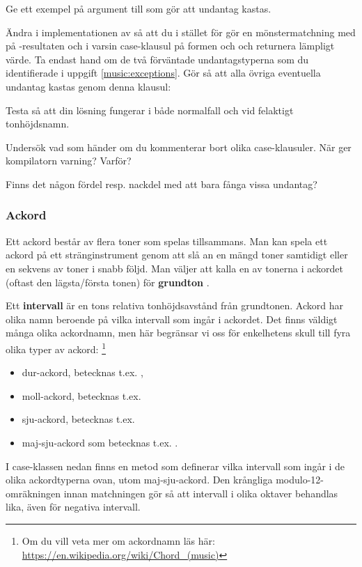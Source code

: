 {\Subtask\Pen Ge ett exempel på argument till  som gör att undantag kastas.


\Task Ändra i implementationen av  så att du i stället för  gör en mönstermatchning med  på -resultaten  och  i varsin case-klausul på formen  och  och returnera lämpligt värde. Ta endast hand om de två förväntade undantagstyperna som du identifierade i uppgift \ref{music:exceptions}. Gör så att alla övriga eventuella undantag kastas genom denna klausul: 

\Subtask Testa så att din lösning fungerar i både normalfall och vid felaktigt tonhöjdsnamn.

\Subtask\Pen Undersök vad som händer om du kommenterar bort olika case-klausuler. När ger kompilatorn varning? Varför?

\Subtask\Pen Finns det någon fördel resp. nackdel med att bara fånga vissa undantag?

\subsubsection{Ackord}

Ett ackord består av flera toner som spelas tillsammans. Man kan spela ett ackord på ett stränginstrument genom att slå an en mängd toner samtidigt eller en sekvens av toner i snabb följd. Man väljer att kalla en av tonerna i ackordet (oftast den lägsta/första tonen) för \textbf{grundton} .

Ett \textbf{intervall} är en tons relativa tonhöjdsavstånd från grundtonen. Ackord har olika namn beroende på vilka intervall som ingår i ackordet. Det finns väldigt många olika ackordnamn, men här begränsar vi oss för enkelhetens skull till fyra olika typer av ackord: \footnote{Om du vill veta mer om ackordnamn läs här: \url{https://en.wikipedia.org/wiki/Chord_(music)}}
\begin{itemize}
  \item dur-ackord, betecknas t.ex. ,
  \item moll-ackord, betecknas t.ex. 
  \item sju-ackord, betecknas t.ex. 
  \item maj-sju-ackord som betecknas t.ex. .
\end{itemize}

I case-klassen  nedan finns en metod  som definerar vilka intervall som ingår i de olika ackordtyperna ovan, utom maj-sju-ackord. Den krångliga modulo-12-omräkningen innan matchningen gör så att intervall i olika oktaver behandlas lika, även för negativa intervall.

}
